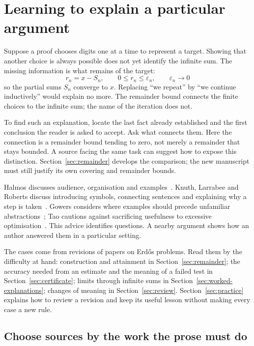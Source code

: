 \section{Learning to explain a particular argument}\label{sec:reading}

Suppose a proof chooses digits one at a time to represent a target. Showing
that another choice is always possible does not yet identify the infinite
sum. The missing information is what remains of the target:
\[
 r_n=x-S_n,\qquad 0\le r_n\le\varepsilon_n,\qquad
 \varepsilon_n\longrightarrow0
\]
so the partial sums $S_n$ converge to $x$. Replacing ``we repeat'' by
``we continue inductively'' would explain no more. The remainder bound connects
the finite choices to the infinite sum; the name of the iteration does not.

To find such an explanation, locate the last fact already established and
the first conclusion the reader is asked to accept. Ask what connects them.
Here the connection is a remainder bound tending to zero, not merely a
remainder that stays bounded. A source facing the same task can suggest how
to expose this distinction. Section~\ref{sec:remainder} develops the comparison;
the new manuscript must still justify its own covering and remainder bounds.

Halmos discusses audience, organisation and examples~\cite[\S\S3--4]{halmos}.
Knuth, Larrabee and Roberts discuss introducing symbols, connecting sentences
and explaining why a step is taken~\cite[\S1]{knuth}. Gowers considers where
examples should precede unfamiliar abstractions~\cite{gowers}; Tao cautions
against sacrificing usefulness to excessive optimisation~\cite{tao}.
This advice identifies questions. A nearby argument shows how an author
answered them in a particular setting.

The cases come from revisions of papers on Erd\H{o}s problems. Read them by
the difficulty at hand: construction and attainment in
Section~\ref{sec:remainder}; the accuracy needed from an estimate and the
meaning of a failed test in Section~\ref{sec:certificate}; limits through
infinite sums in Section~\ref{sec:worked-explanations}; changes of meaning in
Section~\ref{sec:review}. Section~\ref{sec:practice} explains how to review a
revision and keep its useful lesson without making every case a new rule.

\subsection{Choose sources by the work the prose must do}

